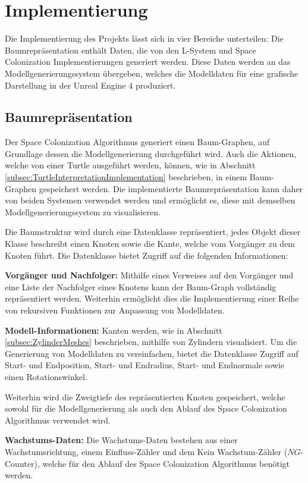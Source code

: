\chapter{Implementierung}


Die Implementierung des Projekts lässt sich in vier Bereiche unterteilen: Die Baumrepräsentation enthält Daten, die von den L-System und Space Colonization Implementierungen generiert werden. Diese Daten werden an das Modellgenerierungssystem übergeben, welches die Modelldaten für eine grafische Darstellung in der Unreal Engine 4 produziert.


\section{Baumrepräsentation}

Der Space Colonization Algorithmus generiert einen Baum-Graphen, auf Grundlage dessen die Modellgenerierung durchgeführt wird. Auch die Aktionen, welche von einer Turtle ausgeführt werden, können, wie in Abschnitt \ref{subsec:TurtleInterpretationImplementation} beschrieben, in einem Baum-Graphen gespeichert werden. Die implementierte Baumrepräsentation kann daher von beiden Systemen verwendet werden und ermöglicht es, diese mit demselben Modellgenerierungssystem zu visualisieren.

Die Baumstruktur wird durch eine Datenklasse repräsentiert, jedes Objekt dieser Klasse beschreibt einen Knoten sowie die Kante, welche vom Vorgänger zu dem Knoten führt. Die Datenklasse bietet Zugriff auf die folgenden Informationen:

\begin{description}
	\item \textbf{Vorgänger und Nachfolger:} Mithilfe eines Verweises auf den Vorgänger und eine Liste der Nachfolger eines Knotens kann der Baum-Graph vollständig repräsentiert werden. Weiterhin ermöglicht dies die Implementierung einer Reihe von rekursiven Funktionen zur Anpassung von Modelldaten.\\
	
	\item \textbf{Modell-Informationen:} Kanten werden, wie in Abschnitt \ref{subsec:ZylinderMeshes} beschrieben, mithilfe von Zylindern visualisiert. Um die Generierung von Modelldaten zu vereinfachen, bietet die Datenklasse Zugriff auf Start- und Endposition, Start- und Endradius, Start- und Endnormale sowie einen Rotationswinkel. 
	
	Weiterhin wird die Zweigtiefe des repräsentierten Knoten gespeichert, welche sowohl für die Modellgenerierung als auch den Ablauf des Space Colonization Algorithmus verwendet wird.\\
	
	\item \textbf{Wachstums-Daten:} Die Wachstums-Daten bestehen aus einer Wachstumsrichtung, einem Einfluss-Zähler und dem \glqq Kein Wachstum\grqq-Zähler ($NG$-Counter), welche für den Ablauf des Space Colonization Algorithmus benötigt werden.	
\end{description}

